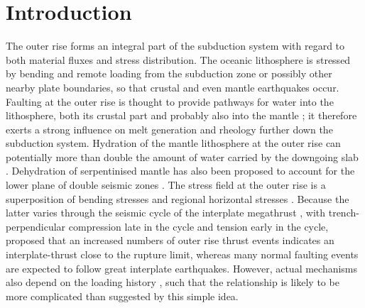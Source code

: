 \documentclass[reviewcopy]{elsart}
\providecommand{\pagewiselinenumbers}{}
\begin{document}
\pagewiselinenumbers
\section{Introduction}

The outer rise forms an integral part of the subduction system with
regard to both material fluxes and stress distribution. The oceanic lithosphere is stressed by 
bending and remote loading from the subduction zone or possibly other nearby plate boundaries, so that crustal and even mantle earthquakes occur.
Faulting at the outer rise is thought to provide pathways for water into the
lithosphere, both its crustal part \citep{kirby96} and probably also
into the mantle  \citep{ranero03,ranero04,grevemeyer07}; it therefore exerts a strong
influence on melt generation and rheology further down the subduction
system.  Hydration of the mantle lithosphere at the outer rise can
potentially more than double the amount of water carried by the
downgoing slab \citep{rupke04}. Dehydration of serpentinised mantle
has also been proposed to account for the lower plane of double
seismic zones \citep{peacock01}.
 The  stress field at the outer rise is a superposition of bending
stresses and regional horizontal stresses \citep{christensen88}.
Because the latter varies through the seismic cycle of the interplate
megathrust \citep[e.g.][]{taylor96}, with trench-perpendicular
compression late in the cycle and tension early in the cycle,
\citet{christensen88} proposed that an 
increased numbers of outer rise thrust events indicates an
interplate-thrust close to the rupture limit, whereas many normal faulting events
are expected to follow great interplate earthquakes. However, actual
mechanisms also depend on the loading history \citep{mueller96b}, such that the
relationship is likely to be more complicated than suggested by this
simple idea.
\end{document}
